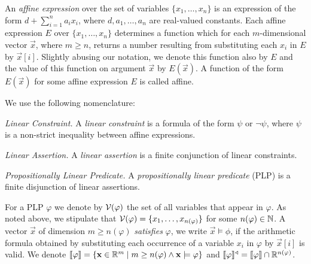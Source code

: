 \smallskip{}
An \emph{affine expression} over the set of variables $\{x_1,\dots,x_n\}$ is an 
expression of the form $d+\sum_{i=1}^{n}a_i
x_i$, where  $d,a_1,\dots,a_n$ are real-valued
constants. Each affine expression $E$ over $\{x_1,\dots,x_n\}$ 
determines a function which for each $m$-dimensional vector $\vec{x}$, where $m\geq n$,  
returns a number resulting from substituting each $x_i$ in $E$ by $\vec{x}[i]$. 
Slightly abusing our notation, we denote this function also by $E$ and the 
value of this function on argument $\vec{x}$ by $E(\vec{x})$. A function of the form $E(\vec{x})$ for some affine expression $E$ is called affine.

\smallskip{}
We use the following nomenclature:
\begin{compactitem}
\item {\em Linear Constraint.} A \emph{linear constraint} is a formula of the
form $\psi$ or $\neg\psi$, where  $\psi$ is a non-strict inequality
between affine expressions.
\item {\em Linear Assertion.} A \emph{linear assertion} is a finite conjunction
of linear constraints.
\item {\em Propositionally Linear Predicate.}
A  \emph{propositionally linear predicate} (PLP) is a finite disjunction of
linear assertions.
\end{compactitem}

For a PLP $\varphi$ we denote by $\mathcal{V}(\varphi)$ the set of all variables that 
appear in $\varphi$. As noted above, we stipulate that $\mathcal{V}(\varphi)=\{x_1,\dots,x_{n(\varphi)}\}$ for some $n(\varphi)\in \mathbb{N}$. A vector $\vec{x}$ of dimension $m\geq n(\varphi)$ \emph{satisfies} $\varphi$, we write 
$\vec{x}\models\phi$, if 
 the arithmetic formula obtained by 
substituting each occurrence of a variable $x_i$ in $\varphi$ by $\vec{x}[i]$ is 
valid. We denote $\llbracket \varphi \rrbracket = \{\mathbf{x}\in \mathbb{R}^m\mid m\geq n(\varphi) \wedge \mathbf{x} \models\varphi\}$ 
and $\llbracket \varphi \rrbracket^{\triangleleft} = \llbracket \varphi \rrbracket
\cap \mathbb{R}^{n(\varphi)}$. 




